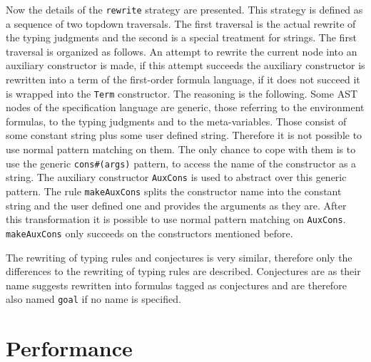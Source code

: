 Now the details of the \texttt{rewrite} strategy are presented. This
strategy is defined as a sequence of two topdown traversals. The first
traversal is the actual rewrite of the typing judgments and the second
is a special treatment for strings. The first traversal is organized
as follows. An attempt to rewrite the current node into an auxiliary
constructor is made, if this attempt succeeds the auxiliary
constructor is rewritten into a term of the first-order formula
language, if it does not succeed it is wrapped into the \texttt{Term}
constructor. The reasoning is the following. Some AST nodes of the
specification language are generic, those referring to the environment
formulas, to the typing judgments and to the meta-variables. Those
consist of some constant string plus some user defined
string. Therefore it is not possible to use normal pattern matching on
them. The only chance to cope with them is to use the generic
\texttt{cons\#(args)} pattern, to access the name of the constructor as
a string. The auxiliary constructor \texttt{AuxCons} is used to
abstract over this generic pattern. The rule \texttt{makeAuxCons}
splits the constructor name into the constant string and the user
defined one and provides the arguments as they are. After this
transformation it is possible to use normal pattern matching on
\texttt{AuxCons}. \texttt{makeAuxCons} only succeeds on the
constructors mentioned before. 

The rewriting of typing rules and conjectures is very similar,
therefore only the differences to the rewriting of typing rules are
described. Conjectures are as their name suggests rewritten into
formulas tagged as conjectures and are therefore also named
\texttt{goal} if no name is specified. 

\section{Performance}
